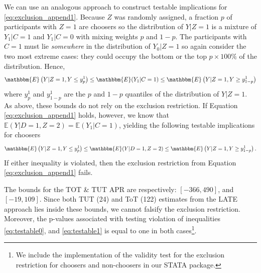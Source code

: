 We can use an analogous approach to construct testable implications for \ref{eq:exclusion_append1}. 
Because $Z$ was randomly assigned, a fraction $p$ of participants with $Z = 1$ are choosers so the distribution of $Y|Z=1$ is a mixture of $Y_1|C=1$ and $Y_1|C=0$ with mixing weights $p$ and $1 -p$.
The participants with $C = 1$ must lie \emph{somewhere} in the distribution of $Y_0|Z=1$ so again consider the two most extreme cases: they could occupy the bottom or the top $p\times 100\%$ of the distribution. 
Hence,
\[
\mathbbm{E}\left(Y|Z=1,Y\leq y^1_{p}\right) \leq \mathbbm{E}(Y_1|C=1) \leq \mathbbm{E}\left(Y|Z=1,Y \geq y^1_{1-p}\right)
\]
where $y^1_p$ and $y^1_{1-p}$ are the $p$ and $1 - p$ quantiles of the distribution of $Y|Z=1$.
As above, these bounds do not rely on the exclusion restriction.
If Equation \ref{eq:exclusion_append1} holds, however, we know that $\mathbb{E}(Y|D=1,Z=2) = \mathbb{E}(Y_1|C=1)$, yielding the following testable implications for choosers
\begin{equation}
\mathbbm{E}\left(Y|Z=1,Y\leq y^1_{p}\right) \leq \mathbbm{E}(Y|D=1,Z=2) \leq \mathbbm{E}\left(Y|Z=1,Y \geq y^1_{1-p}\right).
\label{eq:testable1}
\end{equation}
If either inequality is violated, then the exclusion restriction from Equation \ref{eq:exclusion_append1} fails.


The \cite{huber_mellace} bounds for the TOT \& TUT APR are respectively:  $[-366, 490]$, and $[-19, 109]$.
Since both TUT (24) and ToT (122) estimates from the LATE approach lies inside these bounds, we cannot falsify the exclusion restriction. Moreover, the p-values associated with testing violation of inequalities \ref{eq:testable0}, and \ref{eq:testable1} is equal to one in both cases\footnote{We include the implementation of the validity test for the exclusion restriction for choosers and non-choosers in our STATA package.}.


\newpage





